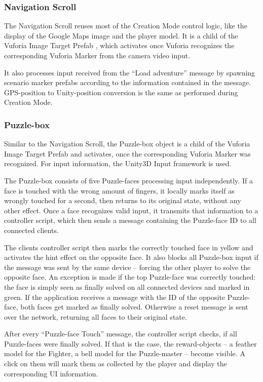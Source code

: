 \documentclass{sigchi-ext}
\begin{document}
\subsubsection{Navigation Scroll}

The Navigation Scroll reuses most of the Creation Mode control logic, like the display of the Google Maps image and the player model. It is a child of the Vuforia Image Target Prefab \cite{vuforiaImageTarget}, which activates once Vuforia recognizes the corresponding Vuforia Marker from the camera video input.

It also processes input received from the ``Load adventure'' message by spawning scenario marker prefabs according to the information contained in the message. GPS-position to Unity-position conversion is the same as performed during Creation Mode.

\subsubsection{Puzzle-box}

Similar to the Navigation Scroll, the Puzzle-box object is a child of the Vuforia Image Target Prefab and activates, once the corresponding Vuforia Marker was recognized. For input information, the Unity3D Input framework is used.

The Puzzle-box consists of five Puzzle-faces processing input independently. If a face is touched with the wrong amount of fingers, it locally marks itself as wrongly touched for a second, then returns to its original state, without any other effect. Once a face recognizes valid input, it transmits that information to a controller script, which then sends a message containing the Puzzle-face ID to all connected clients.

The clients controller script then marks the correctly touched face in yellow and activates the hint effect on the opposite face. It also blocks all Puzzle-box input if the message was sent by the same device -- forcing the other player to solve the opposite face. An exception is made if the top Puzzle-face was correctly touched: the face is simply seen as finally solved on all connected devices and marked in green. If the application receives a message with the ID of the opposite Puzzle-face, both faces get marked as finally solved. Otherwise a reset message is sent over the network, returning all faces to their original state. 

After every ``Puzzle-face Touch'' message, the controller script checks, if all Puzzle-faces were finally solved.  If that is the case, the reward-objects -- a feather model for the Fighter, a bell model for the Puzzle-master -- become visible. A click on them will mark them as collected by the player and display the corresponding UI information.
\end{document}
